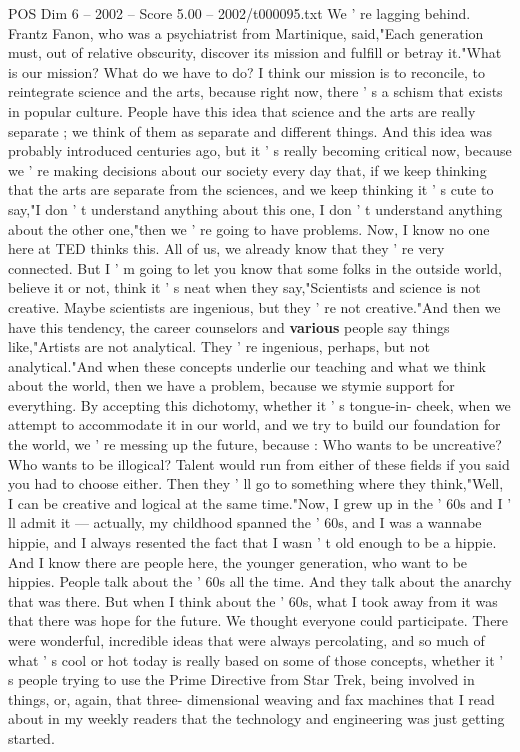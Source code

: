 \begin{textsample}{POS Dim 6 – 2002 – Score 5.00 – 2002/t000095.txt}
We ' re lagging behind.
Frantz Fanon, who was a psychiatrist from Martinique, said,"Each generation must, out of relative obscurity, discover its mission and fulfill or betray it."What is our mission?
What do we have to do?
I think our mission is to reconcile, to reintegrate science and the arts, because right now, there ' s a schism that exists in popular culture.
People have this idea that science and the arts are really separate ; we think of them as separate and different things.
And this idea was probably introduced centuries ago, but it ' s really becoming critical now, because we ' re making decisions about our society every day that, if we keep thinking that the arts are separate from the sciences, and we keep thinking it ' s cute to say,"I don ' t understand anything about this one, I don ' t understand anything about the other one,"then we ' re going to have problems.
Now, I know no one here at TED thinks this.
All of us, we already know that they ' re very connected.
But I ' m going to let you know that some folks in the outside world, believe it or not, think it ' s neat when they say,"Scientists and science is not creative.
Maybe scientists are ingenious, but they ' re not creative."And then we have this tendency, the career counselors and \textbf{various} people say things like,"Artists are not analytical.
They ' re ingenious, perhaps, but not analytical."And when these concepts underlie our teaching and what we think about the world, then we have a problem, because we stymie support for everything.
By accepting this dichotomy, whether it ' s tongue-in- cheek, when we attempt to accommodate it in our world, and we try to build our foundation for the world, we ' re messing up the future, because : Who wants to be uncreative?
Who wants to be illogical?
Talent would run from either of these fields if you said you had to choose either.
Then they ' ll go to something where they think,"Well, I can be creative and logical at the same time."Now, I grew up in the ' 60s and I ' ll admit it — actually, my childhood spanned the ' 60s, and I was a wannabe hippie, and I always resented the fact that I wasn ' t old enough to be a hippie.
And I know there are people here, the younger generation, who want to be hippies.
People talk about the ' 60s all the time.
And they talk about the anarchy that was there.
But when I think about the ' 60s, what I took away from it was that there was hope for the future.
We thought everyone could participate.
There were wonderful, incredible ideas that were always percolating, and so much of what ' s cool or hot today is really based on some of those concepts, whether it ' s people trying to use the Prime Directive from Star Trek, being involved in things, or, again, that three- dimensional weaving and fax machines that I read about in my weekly readers that the technology and engineering was just getting started.

\end{textsample}
